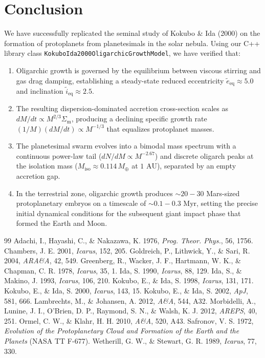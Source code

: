 \documentclass[11pt,a4paper]{article}
\begin{document}
\section{Conclusion}
We have successfully replicated the seminal study of Kokubo \& Ida (2000) on the formation of protoplanets from planetesimals in the solar nebula. Using our C++ library class \texttt{KokuboIda2000OligarchicGrowthModel}, we have verified that:
\begin{enumerate}
    \item Oligarchic growth is governed by the equilibrium between viscous stirring and gas drag damping, establishing a steady-state reduced eccentricity $\tilde{e}_{\text{eq}} \approx 5.0$ and inclination $\tilde{i}_{\text{eq}} \approx 2.5$.
    \item The resulting dispersion-dominated accretion cross-section scales as $dM/dt \propto M^{2/3} \Sigma_{\text{m}}$, producing a declining specific growth rate $(1/M)(dM/dt) \propto M^{-1/3}$ that equalizes protoplanet masses.
    \item The planetesimal swarm evolves into a bimodal mass spectrum with a continuous power-law tail ($dN/dM \propto M^{-2.67}$) and discrete oligarch peaks at the isolation mass ($M_{\text{iso}} \approx 0.114\,M_\oplus$ at $1\text{ AU}$), separated by an empty accretion gap.
    \item In the terrestrial zone, oligarchic growth produces $\sim 20 - 30$ Mars-sized protoplanetary embryos on a timescale of $\sim 0.1 - 0.3\text{ Myr}$, setting the precise initial dynamical conditions for the subsequent giant impact phase that formed the Earth and Moon.
\end{enumerate}

\begin{thebibliography}{99}
 Adachi, I., Hayashi, C., \& Nakazawa, K. 1976, \textit{Prog. Theor. Phys.}, 56, 1756.
 Chambers, J. E. 2001, \textit{Icarus}, 152, 205.
 Goldreich, P., Lithwick, Y., \& Sari, R. 2004, \textit{ARA\&A}, 42, 549.
 Greenberg, R., Wacker, J. F., Hartmann, W. K., \& Chapman, C. R. 1978, \textit{Icarus}, 35, 1.
 Ida, S. 1990, \textit{Icarus}, 88, 129.
 Ida, S., \& Makino, J. 1993, \textit{Icarus}, 106, 210.
 Kokubo, E., \& Ida, S. 1998, \textit{Icarus}, 131, 171.
 Kokubo, E., \& Ida, S. 2000, \textit{Icarus}, 143, 15.
 Kokubo, E., \& Ida, S. 2002, \textit{ApJ}, 581, 666.
 Lambrechts, M., \& Johansen, A. 2012, \textit{A\&A}, 544, A32.
 Morbidelli, A., Lunine, J. I., O'Brien, D. P., Raymond, S. N., \& Walsh, K. J. 2012, \textit{AREPS}, 40, 251.
 Ormel, C. W., \& Klahr, H. H. 2010, \textit{A\&A}, 520, A43.
 Safronov, V. S. 1972, \textit{Evolution of the Protoplanetary Cloud and Formation of the Earth and the Planets} (NASA TT F-677).
 Wetherill, G. W., \& Stewart, G. R. 1989, \textit{Icarus}, 77, 330.
\end{thebibliography}
\end{document}
